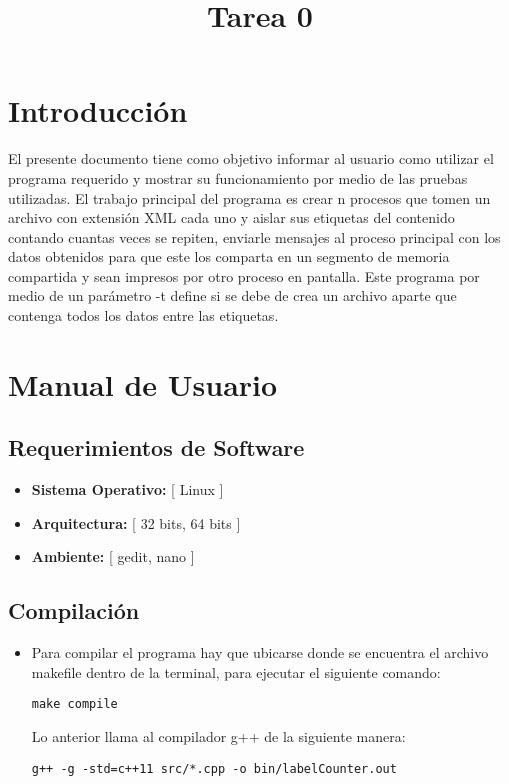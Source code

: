 \title{Tarea 0}



\section{Introducción}
El presente documento tiene como objetivo informar al usuario como utilizar el programa requerido y mostrar su funcionamiento por medio de las pruebas utilizadas. El trabajo principal del programa es crear n procesos que tomen un archivo con extensión XML cada uno y aislar sus etiquetas del contenido contando cuantas veces se repiten, enviarle mensajes al proceso principal con los datos obtenidos para que este los comparta en un segmento de memoria compartida y sean impresos por otro proceso en pantalla. Este programa por medio de un parámetro -t define si se debe de crea un archivo aparte que contenga todos los datos entre las etiquetas. 

\section{Manual de Usuario}
\subsection{Requerimientos de Software}
	\begin{itemize}
    \item	\textbf{Sistema Operativo:} [ Linux ]
    \item	\textbf{Arquitectura:} [ 32 bits, 64 bits ]
    \item	\textbf{Ambiente:} [ gedit, nano ]
    \end{itemize}
\subsection{Compilación}
\begin{itemize}
    \item[]Para compilar el programa hay que ubicarse donde se encuentra el archivo makefile dentro de la terminal, para ejecutar el siguiente comando:
\begin{lstlisting}[style= Cstyle]
	make compile
\end{lstlisting}
  	Lo anterior llama al compilador g++ de la siguiente manera: 
\begin{lstlisting}[style= Cstyle]
	g++ -g -std=c++11 src/*.cpp -o bin/labelCounter.out
\end{lstlisting}
    \end{itemize}
